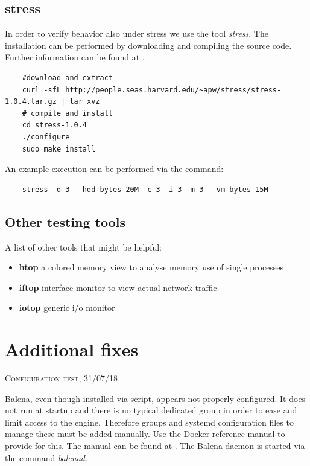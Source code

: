 \documentclass[]{scrartcl}
\begin{document}
\subsection{stress}

In order to verify behavior also under stress we use the tool \textit{stress}. The installation can be performed by downloading and compiling the source code. Further information can be found at \cite{stress01}.

\begin{verbatim}
	#download and extract
	curl -sfL http://people.seas.harvard.edu/~apw/stress/stress-1.0.4.tar.gz | tar xvz
	# compile and install
	cd stress-1.0.4
	./configure
	sudo make install
\end{verbatim}

An example execution can be performed via the command:

\begin{verbatim}
	stress -d 3 --hdd-bytes 20M -c 3 -i 3 -m 3 --vm-bytes 15M
\end{verbatim}

\subsection{Other testing tools}

A list of other tools that might be helpful:

\begin{itemize}
	\item \textbf{htop} a colored memory view to analyse memory use of single processes
	\item \textbf{iftop} interface monitor to view actual network traffic
	\item \textbf{iotop} generic i/o monitor
\end{itemize}

\section{Additional fixes}
{\small\textsc{Configuration test, 31/07/18} \bigskip}

Balena, even though installed via script, appears not properly configured. It does not run at startup and there is no typical dedicated group in order to ease and limit access to the engine.
Therefore groups and systemd configuration files to manage these must be added manually. Use the Docker reference manual to provide for this. The manual can be found at \cite{docker02}. The Balena daemon is started via the command \textit{balenad}.
\end{document}
